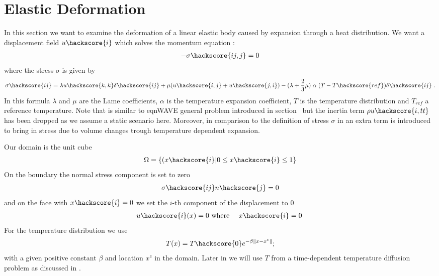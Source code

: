 
%
%
%


\section{Elastic Deformation}
\label{ELASTIC CHAP}
In this section we want to examine the deformation of a linear elastic body caused by expansion through a heat distribution. We want 
a displacement field $u\hackscore{i}$ which solves the momentum equation
:
\begin{eqnarray}\label{HEATEDBLOCK general problem}
 - \sigma\hackscore{ij,j}=0
\end{eqnarray}
where the stress $\sigma$ is given by
\begin{eqnarray}\label{HEATEDBLOCK linear elastic}
 \sigma\hackscore{ij}= \lambda u\hackscore{k,k} \delta\hackscore{ij} + \mu ( u\hackscore{i,j} + u\hackscore{j,i})
 - (\lambda+\frac{2}{3} \mu)  \; \alpha  \;  (T-T\hackscore{ref})\delta\hackscore{ij} \;.
\end{eqnarray}
In this formula $\lambda$ and $\mu$ are the Lame coefficients, $\alpha$ is the 
temperature expansion coefficient, $T$ is the temperature distribution and $T_{ref}$ a reference temperature. Note that 
 is similar to eqn{WAVE general problem} introduced in section~ but the
inertia term $\rho u\hackscore{i,tt}$ has been dropped as we assume a static scenario here. Moreover, in 
comparison to the 
definition of stress $\sigma$ in  an extra term is introduced 
to bring in stress due to volume changes trough temperature dependent expansion.   

Our domain is the unit cube 
\begin{eqnarray} \label{HEATEDBLOCK natural location}
\Omega=\{(x\hackscore{i} | 0 \le x\hackscore{i} \le 1 \}
\end{eqnarray}
On the boundary the normal stress component is set to zero
\begin{eqnarray} \label{HEATEDBLOCK natural}
\sigma\hackscore{ij}n\hackscore{j}=0
\end{eqnarray}
and on the face with $x\hackscore{i}=0$ we set the $i$-th component of the displacement to $0$
\begin{eqnarray} \label{HEATEDBLOCK constraint}
u\hackscore{i}(x)=0 & \mbox{ where } & x\hackscore{i}=0 \; 
\end{eqnarray}
For the temperature distribution we use 
\begin{eqnarray} \label{HEATEDBLOCK temperature}
T(x)= T\hackscore{0} e^{-\beta \|x-x^{c}\|}; 
\end{eqnarray}
with a given positive constant $\beta$ and location $x^{c}$ in the domain. Later in  we will use
$T$ from a time-dependent temperature diffusion problem as discussed in .

